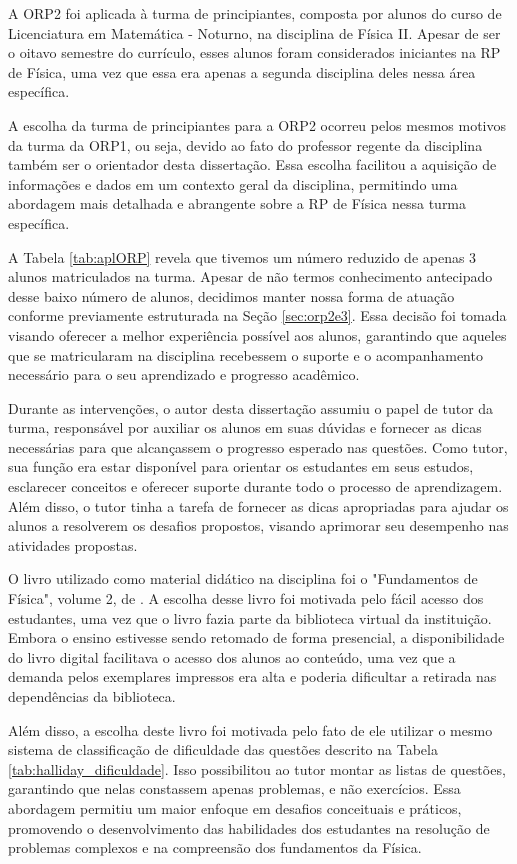 A ORP2 foi aplicada à turma de principiantes, composta por alunos do curso de Licenciatura em Matemática - Noturno, na disciplina de Física II. Apesar de ser o oitavo semestre do currículo, esses alunos foram considerados iniciantes na RP de Física, uma vez que essa era apenas a segunda disciplina deles nessa área específica.

 A escolha da turma de principiantes para a ORP2 ocorreu pelos mesmos motivos da turma da ORP1, ou seja, devido ao fato do professor regente da disciplina também ser o orientador desta dissertação. Essa escolha facilitou a aquisição de informações e dados em um contexto geral da disciplina, permitindo uma abordagem mais detalhada e abrangente sobre a RP de Física nessa turma específica.

A Tabela \ref{tab:aplORP} revela que tivemos um número reduzido de apenas 3 alunos matriculados na turma. Apesar de não termos conhecimento antecipado desse baixo número de alunos, decidimos manter nossa forma de atuação conforme previamente estruturada na Seção \ref{sec:orp2e3}. Essa decisão foi tomada visando oferecer a melhor experiência possível aos alunos, garantindo que aqueles que se matricularam na disciplina recebessem o suporte e o acompanhamento necessário para o seu aprendizado e progresso acadêmico.

Durante as intervenções, o autor desta dissertação assumiu o papel de tutor da turma, responsável por auxiliar os alunos em suas dúvidas e fornecer as dicas necessárias para que alcançassem o progresso esperado nas questões. Como tutor, sua função era estar disponível para orientar os estudantes em seus estudos, esclarecer conceitos e oferecer suporte durante todo o processo de aprendizagem. Além disso, o tutor tinha a tarefa de fornecer as dicas apropriadas para ajudar os alunos a resolverem os desafios propostos, visando aprimorar seu desempenho nas atividades propostas. 

O livro utilizado como material didático na disciplina foi o "Fundamentos de Física", volume 2, de . A escolha desse livro foi motivada pelo fácil acesso dos estudantes, uma vez que o livro fazia parte da biblioteca virtual da instituição. Embora o ensino estivesse sendo retomado de forma presencial, a disponibilidade do livro digital facilitava o acesso dos alunos ao conteúdo, uma vez que a demanda pelos exemplares impressos era alta e poderia dificultar a retirada nas dependências da biblioteca.

Além disso, a escolha deste livro foi motivada pelo fato de ele utilizar o mesmo sistema de classificação de dificuldade das questões descrito na Tabela \ref{tab:halliday_dificuldade}. Isso possibilitou ao tutor montar as listas de questões, garantindo que nelas constassem apenas problemas, e não exercícios. Essa abordagem permitiu um maior enfoque em desafios conceituais e práticos, promovendo o desenvolvimento das habilidades dos estudantes na resolução de problemas complexos e na compreensão dos fundamentos da Física.

